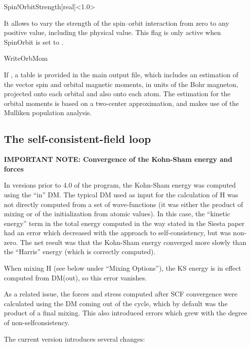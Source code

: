 \begin{fdfentry}{Spin!OrbitStrength}[real]<1.0>

  It allows to vary the strength of the spin--orbit interaction from
  zero to any positive value, including the physical value. This flag
  is only active when SpinOrbit is set to \fdftrue.

\end{fdfentry}

\begin{fdflogicalF}{WriteOrbMom}

  If \fdftrue, a table is provided in the main output file, which
  includes an estimation of the vector spin and orbital magnetic
  moments, in units of the Bohr magneton, projected onto each orbital
  and also onto each atom. The estimation for the orbital moments is
  based on a two-center approximation, and makes use of the Mulliken
  population analysis.

\end{fdflogicalF}


\subsection{The self-consistent-field loop}

\textbf{IMPORTANT NOTE: Convergence of the Kohn-Sham energy and forces}

In versions prior to 4.0 of the program, the Kohn-Sham energy was computed
using the ``in'' DM. The typical DM used as input for the calculation
of H was not directly computed from a set of wave-functions (it was
either the product of mixing or of the initialization from atomic
values). In this case, the ``kinetic energy'' term in the total energy
computed in the way stated in the Siesta paper had an error which
decreased with the approach to self-consistency, but was non-zero. The
net result was that the Kohn-Sham energy converged more slowly than
the ``Harris'' energy (which is correctly computed).

When mixing H (see below under ``Mixing Options''), the KS energy is
in effect computed from DM(out), so this error vanishes.

As a related issue, the forces and stress computed after SCF
convergence were calculated using the DM coming out of the cycle,
which by default was the product of a final mixing. This also
introduced errors which grew with the degree of non-selfconsistency.

The current version introduces several changes:

